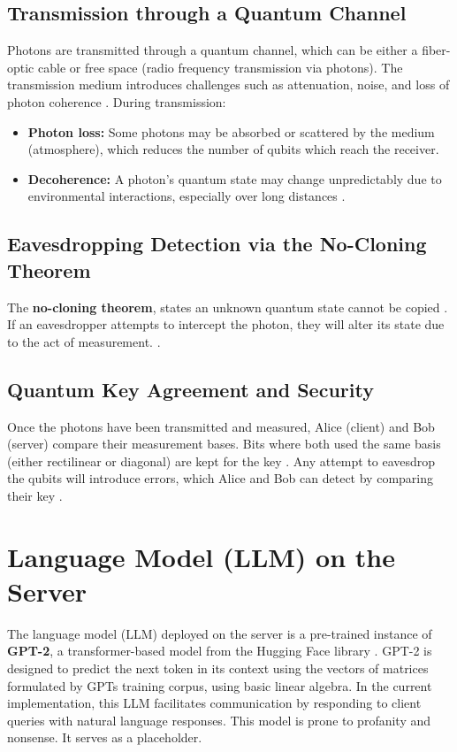 \documentclass{article}
\begin{document}
\subsection{Transmission through a Quantum Channel}
Photons are transmitted through a quantum channel, which can be either a fiber-optic cable or free space (radio frequency transmission via photons). The transmission medium introduces challenges such as attenuation, noise, and loss of photon coherence \parencite{patel2020}. During transmission:
\begin{itemize}
    \item \textbf{Photon loss:} Some photons may be absorbed or scattered by the medium (atmosphere), which reduces the number of qubits which reach the receiver\parencite{aktas2016}.
    \item \textbf{Decoherence:} A photon's quantum state may change unpredictably due to environmental interactions, especially over long distances \parencite{nielsen2010}.
\end{itemize}

\subsection{Eavesdropping Detection via the No-Cloning Theorem}
The \textbf{no-cloning theorem}, states an unknown quantum state cannot be copied \parencite{lo2012}. If an eavesdropper attempts to intercept the photon, they will alter its state due to the act of measurement. \parencite{bennett1984}.

\subsection{Quantum Key Agreement and Security}
Once the photons have been transmitted and measured, Alice (client) and Bob (server) compare their measurement bases. Bits where both used the same basis (either rectilinear or diagonal) are kept for the key \parencite{bennett1984}. Any attempt to eavesdrop the qubits will introduce errors, which Alice and Bob can detect by comparing their key \parencite{lo2012}.

\section{Language Model (LLM) on the Server}

The language model (LLM) deployed on the server is a pre-trained instance of \textbf{GPT-2}, a transformer-based model from the Hugging Face library \parencite{huggingface_gpt2_2024}. GPT-2 is designed to predict the next token in its context using the vectors of matrices formulated by GPTs training corpus, using basic linear algebra.  In the current implementation, this LLM facilitates communication by responding to client queries with natural language responses. This model is prone to profanity and nonsense. It serves as a placeholder.
\end{document}
